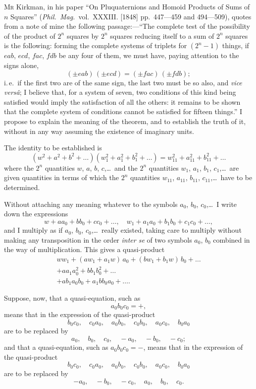 \documentclass[11pt,a4paper]{book}
\begin{document}
\textsc{Mr} Kirkman, in his paper ``On Pluquaternions and Homoid Products of Sums of $n$ Squares'' (\textit{Phil.\ Mag.}\ vol.~XXXIII. [1848] pp.~447---459 and 494---509), quotes from a note of mine the following passage:---``The complete test of the possibility of the product of $2^n$ squares by $2^n$ squares reducing itself to a sum of $2^n$ squares is the following: forming the complete systems of triplets for $(2^n-1)$ things, if $eab$, $ecd$, $fac$, $fdb$ be any four of them, we must have, paying attention to the signs alone,
\[
(\pm eab)\,(\pm ecd) = (\pm fac)\,(\pm fdb);
\]
i.\,e.\ if the first two are of the same sign, the last two must be so also, and \textit{vice vers\^a}; I believe that, for a system of seven, two conditions of this kind being satisfied would imply the satisfaction of all the others: it remains to be shown that the complete system of conditions cannot be satisfied for fifteen things.'' I propose to explain the meaning of the theorem, and to establish the truth of it, without in any way assuming the existence of imaginary units.

The identity to be established is
\[
(w^2 + a^2 + b^2 + \ldots)(w_1^2 + a_1^2 + b_1^2 + \ldots) = w_{11}^2 + a_{11}^2 + b_{11}^2 + \ldots
\]
where the $2^n$ quantities $w$, $a$, $b$, $c$,\ldots\ and the $2^n$ quantities $w_1$, $a_1$, $b_1$, $c_1$,\ldots\ are given quantities in terms of which the $2^n$ quantities $w_{11}$, $a_{11}$, $b_{11}$, $c_{11}$,\ldots\ have to be determined.

Without attaching any meaning whatever to the symbols $a_0$, $b_0$, $c_0$,\ldots\ I write down the expressions
\[
w + aa_0 + bb_0 + cc_0 + \ldots, \quad w_1 + a_1a_0 + b_1b_0 + c_1c_0 + \ldots,
\]
and I multiply as if $a_0$, $b_0$, $c_0$,\ldots\ really existed, taking care to multiply without making any transposition in the order \textit{inter se} of two symbols $a_0$, $b_0$ combined in the way of multiplication. This gives a quasi-product
\begin{multline*}
ww_1 + (aw_1+a_1w)\,a_0 + (bw_1+b_1w)\,b_0 + \ldots\\
+ aa_1 a_0^2 + bb_1 b_0^2 + \ldots\\
+ ab_1 a_0 b_0 + a_1 b b_0 a_0 + \ldots.
\end{multline*}

Suppose, now, that a quasi-equation, such as
\[
a_0 b_0 c_0 = +,
\]
means that in the expression of the quasi-product
\[
b_0 c_0, \quad c_0 a_0, \quad a_0 b_0, \quad c_0 b_0, \quad a_0 c_0, \quad b_0 a_0
\]
are to be replaced by
\[
a_0, \quad b_0, \quad c_0, \quad -a_0, \quad -b_0, \quad -c_0;
\]
and that a quasi-equation, such as $a_0 b_0 c_0 = -$, means that in the expression of the quasi-product
\[
b_0 c_0, \quad c_0 a_0, \quad a_0 b_0, \quad c_0 b_0, \quad a_0 c_0, \quad b_0 a_0
\]
are to be replaced by
\[
-a_0, \quad -b_0, \quad -c_0, \quad a_0, \quad b_0, \quad c_0.
\]
\end{document}
